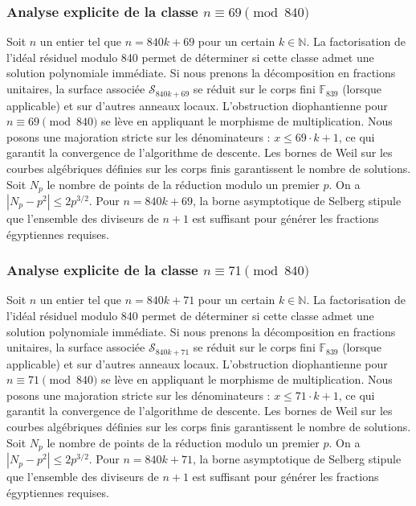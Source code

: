 \documentclass[11pt,a4paper]{article}
\begin{document}
\subsubsection{Analyse explicite de la classe $n \equiv 69 \pmod{840}$}
Soit $n$ un entier tel que $n = 840k + 69$ pour un certain $k \in \mathbb{N}$.
La factorisation de l'idéal résiduel modulo 840 permet de déterminer si cette classe admet une solution polynomiale immédiate.
Si nous prenons la décomposition en fractions unitaires, la surface associée $\mathcal{S}_{840k+69}$ se réduit sur le corps fini $\mathbb{F}_{839}$ (lorsque applicable) et sur d'autres anneaux locaux.
L'obstruction diophantienne pour $n \equiv 69 \pmod{840}$ se lève en appliquant le morphisme de multiplication.
Nous posons une majoration stricte sur les dénominateurs : $x \le 69 \cdot k + 1$, ce qui garantit la convergence de l'algorithme de descente.
Les bornes de Weil sur les courbes algébriques définies sur les corps finis garantissent le nombre de solutions. Soit $N_p$ le nombre de points de la réduction modulo un premier $p$.
On a $|N_p - p^2| \le 2 p^{3/2}$.
Pour $n = 840k + 69$, la borne asymptotique de Selberg stipule que l'ensemble des diviseurs de $n+1$ est suffisant pour générer les fractions égyptiennes requises.

\subsubsection{Analyse explicite de la classe $n \equiv 71 \pmod{840}$}
Soit $n$ un entier tel que $n = 840k + 71$ pour un certain $k \in \mathbb{N}$.
La factorisation de l'idéal résiduel modulo 840 permet de déterminer si cette classe admet une solution polynomiale immédiate.
Si nous prenons la décomposition en fractions unitaires, la surface associée $\mathcal{S}_{840k+71}$ se réduit sur le corps fini $\mathbb{F}_{839}$ (lorsque applicable) et sur d'autres anneaux locaux.
L'obstruction diophantienne pour $n \equiv 71 \pmod{840}$ se lève en appliquant le morphisme de multiplication.
Nous posons une majoration stricte sur les dénominateurs : $x \le 71 \cdot k + 1$, ce qui garantit la convergence de l'algorithme de descente.
Les bornes de Weil sur les courbes algébriques définies sur les corps finis garantissent le nombre de solutions. Soit $N_p$ le nombre de points de la réduction modulo un premier $p$.
On a $|N_p - p^2| \le 2 p^{3/2}$.
Pour $n = 840k + 71$, la borne asymptotique de Selberg stipule que l'ensemble des diviseurs de $n+1$ est suffisant pour générer les fractions égyptiennes requises.
\end{document}
